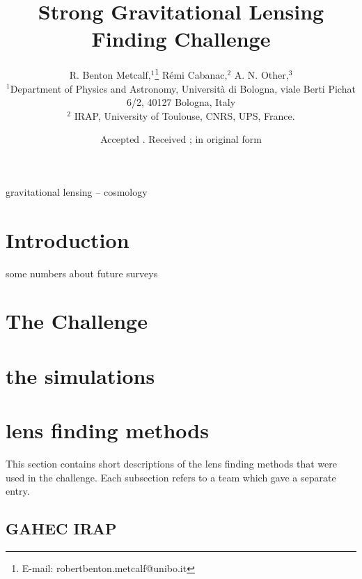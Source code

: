 \documentclass[useAMS,usenatbib]{mn2e}
\title[SL Challenge]{Strong Gravitational  Lensing Finding Challenge}
\author[R. B. Metcalf {\it et al.}]{
R. Benton Metcalf,$^{1}$\thanks{E-mail: robertbenton.metcalf@unibo.it} R\'emi Cabanac,$^2$ 
A. N. Other,$^3$ \\
$^{1}$Department of Physics and Astronomy, Universit\`a di Bologna, viale Berti Pichat 6/2, 40127 Bologna, Italy \\
$^{2}$ IRAP, University of Toulouse, CNRS, UPS, France.\\
}
\begin{document}
\date{Accepted . Received ; in original form }

\maketitle

\label{firstpage}

\begin{abstract}

\end{abstract}

\begin{keywords}
gravitational lensing -- cosmology 
\end{keywords}


\section{Introduction}

some numbers about future surveys

\section{The Challenge}

\section{the simulations}

\section{lens finding methods}

This section contains short descriptions of the lens finding methods that were used in 
the challenge.  Each subsection refers to a team which gave a separate entry.

\subsection{GAHEC IRAP}
\end{document}
